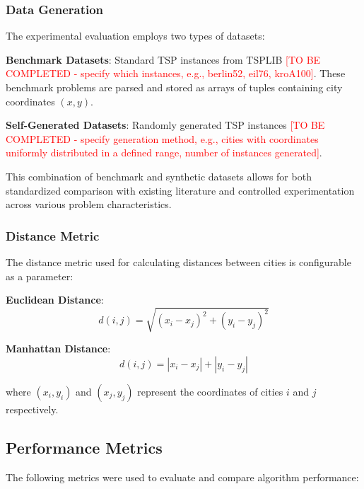 \documentclass{scrartcl}
\begin{document}
\subsubsection{Data Generation}
The experimental evaluation employs two types of datasets:

\textbf{Benchmark Datasets}: Standard TSP instances from TSPLIB \textcolor{red}{[TO BE COMPLETED - specify which instances, e.g., berlin52, eil76, kroA100]}. These benchmark problems are parsed and stored as arrays of tuples containing city coordinates $(x, y)$.

\textbf{Self-Generated Datasets}: Randomly generated TSP instances \textcolor{red}{[TO BE COMPLETED - specify generation method, e.g., cities with coordinates uniformly distributed in a defined range, number of instances generated]}.

This combination of benchmark and synthetic datasets allows for both standardized comparison with existing literature and controlled experimentation across various problem characteristics.

\subsubsection{Distance Metric}
The distance metric used for calculating distances between cities is configurable as a parameter:

\textbf{Euclidean Distance}: 
\begin{equation}
d(i,j) = \sqrt{(x_i - x_j)^2 + (y_i - y_j)^2}
\end{equation}

\textbf{Manhattan Distance}: 
\begin{equation}
d(i,j) = |x_i - x_j| + |y_i - y_j|
\end{equation}

where $(x_i, y_i)$ and $(x_j, y_j)$ represent the coordinates of cities $i$ and $j$ respectively.

\subsection{Performance Metrics}

The following metrics were used to evaluate and compare algorithm performance:
\end{document}
